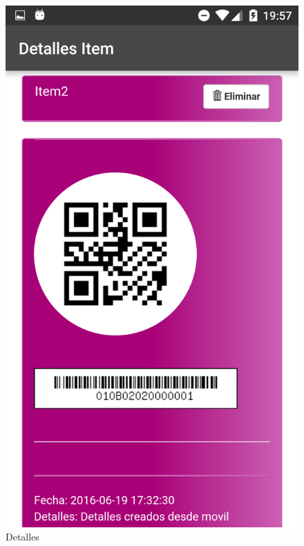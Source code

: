 \documentclass[a4paper,11pt]{book}
\begin{document}
\begin{figure}[H]
  \includegraphics[width=\linewidth]{imagenes/pruebas/movil/movil7.png}
  \caption{Detalles\cite{propio}}
\endminipage\hfill
{}

\end{figure}
\end{document}
